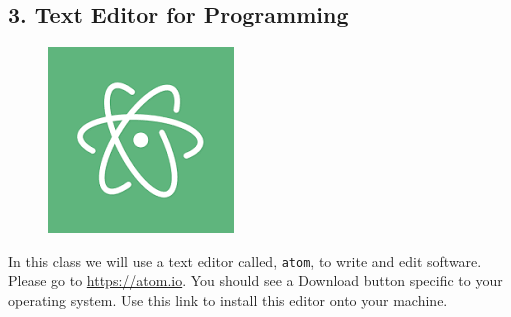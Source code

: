 \subsection*{3. Text Editor for Programming}

\begin{figure}[ht!]
	\begin{center}
	 \includegraphics[scale=.4]{graphics/atom.png}
	\end{center}
\end{figure}


In this class we will use a text editor called, {\tt atom}, to write and edit software. Please go to \url{https://atom.io}. You should see a Download button specific to your operating system. Use this link to install this editor onto your machine.




